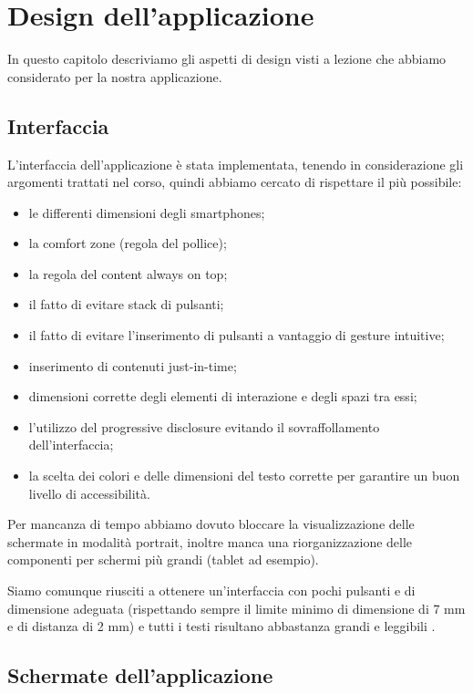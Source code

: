 \chapter{Design dell'applicazione\label{sec:design}}

In questo capitolo descriviamo gli aspetti di design visti a lezione che abbiamo considerato per la nostra applicazione.

\section{Interfaccia\label{sec:interfaccia}}
L'interfaccia dell'applicazione è stata implementata, tenendo in considerazione gli argomenti trattati nel corso, quindi abbiamo cercato di rispettare il più possibile:
\begin{itemize}
    \item le differenti dimensioni degli smartphones;%
    \item la comfort zone (regola del pollice);
    \item la regola del content always on top;
    \item il fatto di evitare stack di pulsanti;
    \item il fatto di evitare l'inserimento di pulsanti a vantaggio di gesture intuitive;
    \item inserimento di contenuti just-in-time;
    \item dimensioni corrette degli elementi di interazione e degli spazi tra essi;
    \item l'utilizzo del progressive disclosure evitando il sovraffollamento dell'interfaccia;
    \item la scelta dei colori e delle dimensioni del testo corrette per garantire un buon livello di accessibilità.
\end{itemize}

Per mancanza di tempo abbiamo dovuto bloccare la visualizzazione delle schermate in modalità portrait, inoltre manca una riorganizzazione delle componenti per schermi più grandi (tablet ad esempio).

Siamo comunque riusciti a ottenere un'interfaccia con pochi pulsanti e di dimensione adeguata (rispettando sempre il limite minimo di dimensione di 7 mm e di distanza di 2 mm) e tutti i testi risultano abbastanza grandi e leggibili \parencite{gaggi:mobileDesign}.

\section{Schermate dell'applicazione\label{sec:schermate}}

